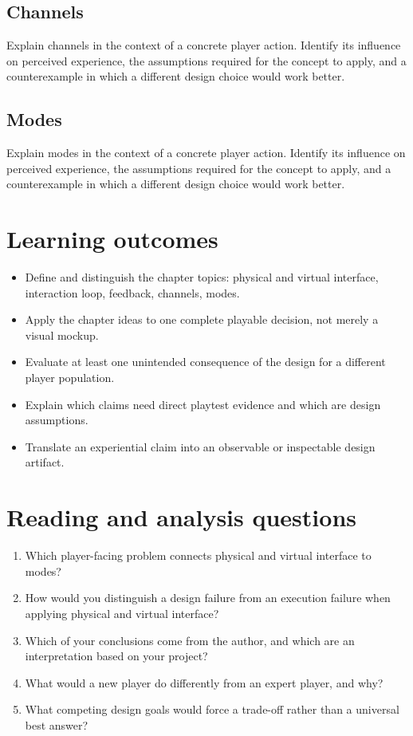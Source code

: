 \documentclass[11pt]{article}
\begin{document}
\subsection{Channels}
Explain channels in the context of a concrete player action. Identify its influence on perceived experience, the assumptions required for the concept to apply, and a counterexample in which a different design choice would work better.


\subsection{Modes}
Explain modes in the context of a concrete player action. Identify its influence on perceived experience, the assumptions required for the concept to apply, and a counterexample in which a different design choice would work better.


\section{Learning outcomes}
\begin{itemize}
\item Define and distinguish the chapter topics: physical and virtual interface, interaction loop, feedback, channels, modes.
\item Apply the chapter ideas to one complete playable decision, not merely a visual mockup.
\item Evaluate at least one unintended consequence of the design for a different player population.
\item Explain which claims need direct playtest evidence and which are design assumptions.
\item Translate an experiential claim into an observable or inspectable design artifact.
\end{itemize}

\section{Reading and analysis questions}
\begin{enumerate}
\item Which player-facing problem connects physical and virtual interface to modes?
\item How would you distinguish a design failure from an execution failure when applying physical and virtual interface?
\item Which of your conclusions come from the author, and which are an interpretation based on your project?
\item What would a new player do differently from an expert player, and why?
\item What competing design goals would force a trade-off rather than a universal best answer?
\end{enumerate}
\end{document}
